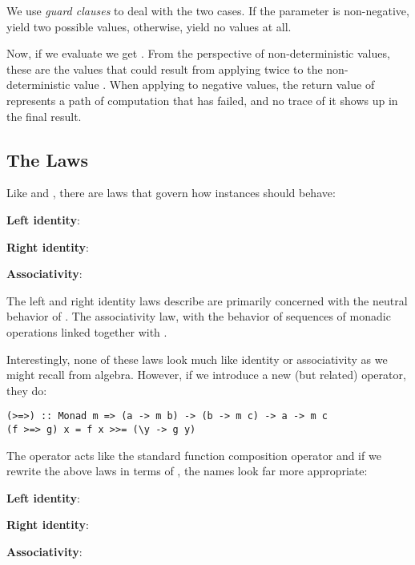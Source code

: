 We use \textit{guard clauses} to deal with the two cases. If the parameter is non-negative, yield two possible values, otherwise,
yield no values at all. 

Now, if we evaluate  we get \code{[2.0, -2.0, 3.0, -3.0]}. From the perspective of non-deterministic
values, these are the values that could result from applying  twice to the non-deterministic value \code{[16.0, 81.0]}.
When applying  to negative values, the return value of \code{[]} represents a path of computation that has failed, and no
trace of it shows up in the final result.

\subsection{The  Laws}

Like  and , there are laws that govern how  instances should behave:

\begin{notelist}
    \item \textbf{Left identity}: 
    \item \textbf{Right identity}: 
    \item \textbf{Associativity}: 
\end{notelist}

The left and right identity laws describe are primarily concerned with the neutral behavior of . The associativity
law, with the behavior of sequences of monadic operations linked together with \code{(>>=)}.

Interestingly, none of these laws look much like identity or associativity as we might recall from algebra. However, if we introduce
a new (but related) operator, they do:

\begin{lstlisting}
(>=>) :: Monad m => (a -> m b) -> (b -> m c) -> a -> m c
(f >=> g) x = f x >>= (\y -> g y)
\end{lstlisting}

The operator \code{(>=>)} acts like the standard function composition operator 
and if we rewrite the above laws in terms of \code{(>=>)}, the names look far more appropriate:

\begin{notelist}
    \item \textbf{Left identity}: 
    \item \textbf{Right identity}: 
    \item \textbf{Associativity}: 
\end{notelist}

